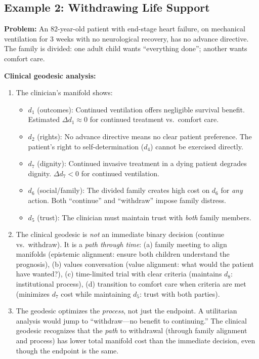 \documentclass[12pt]{article}
\theoremstyle{definition}
\theoremstyle{remark}
\begin{document}
\subsection{Example 2: Withdrawing Life Support}

\textbf{Problem:} An 82-year-old patient with end-stage heart failure, on mechanical ventilation for 3 weeks with no neurological recovery, has no advance directive.  The family is divided: one adult child wants ``everything done''; another wants comfort care.

\textbf{Clinical geodesic analysis:}
\begin{enumerate}
    \item The clinician's manifold shows:
    \begin{itemize}
        \item $d_1$ (outcomes): Continued ventilation offers negligible survival benefit.  Estimated $\Delta d_1 \approx 0$ for continued treatment vs.\ comfort care.
        \item $d_2$ (rights): No advance directive means no clear patient preference.  The patient's right to self-determination ($d_4$) cannot be exercised directly.
        \item $d_7$ (dignity): Continued invasive treatment in a dying patient degrades dignity.  $\Delta d_7 < 0$ for continued ventilation.
        \item $d_6$ (social/family): The divided family creates high cost on $d_6$ for \emph{any} action.  Both ``continue'' and ``withdraw'' impose family distress.
        \item $d_5$ (trust): The clinician must maintain trust with \emph{both} family members.
    \end{itemize}
    \item The clinical geodesic is \emph{not} an immediate binary decision (continue vs.\ withdraw).  It is a \emph{path through time}: (a) family meeting to align manifolds (epistemic alignment: ensure both children understand the prognosis), (b) values conversation (value alignment: what would the patient have wanted?), (c) time-limited trial with clear criteria (maintains $d_8$: institutional process), (d) transition to comfort care when criteria are met (minimizes $d_7$ cost while maintaining $d_5$: trust with both parties).
    \item The geodesic optimizes the \emph{process}, not just the endpoint.  A utilitarian analysis would jump to ``withdraw---no benefit to continuing.''  The clinical geodesic recognizes that the \emph{path} to withdrawal (through family alignment and process) has lower total manifold cost than the immediate decision, even though the endpoint is the same.
\end{enumerate}
\end{document}
